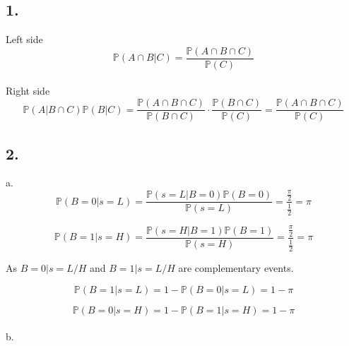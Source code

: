 \subsection*{1.}
Left side
$$\mathds{P}(A \cap B| C)=\frac{\mathds{P}(A\cap B \cap C)}{\mathds{P}(C)}$$
\\
Right side
$$\mathds{P}(A| B\cap C)\mathds{P}(B|C)=\frac{\mathds{P}(A \cap B \cap C)}{\mathds{P}(B \cap C)}\cdot \frac{\mathds{P}(B \cap C)}{\mathds{P}(C)}=\frac{\mathds{P}(A\cap B
 \cap C)}{\mathds{P}(C)}$$

\subsection*{2.}
a.
    $$\mathds{P}(B=0|s=L)=\frac{\mathds{P}(s=L|B=0)\mathds{P}(B=0)}{\mathds{P}(s=L)} = \frac{\frac{\pi}{2}}{\frac{1}{2}} = \pi$$

    $$\mathds{P}(B=1|s=H)=\frac{\mathds{P}(s=H|B=1)\mathds{P}(B=1)}{\mathds{P}(s=H)} = \frac{\frac{\pi}{2}}{\frac{1}{2}} = \pi$$
    
    As $B=0|s=L/H$ and $B=1|s=L/H$ are complementary events. 
    
    $$\mathds{P}(B=1|s=L)=1-\mathds{P}(B=0|s=L)=1-\pi$$
    
    $$\mathds{P}(B=0|s=H)=1-\mathds{P}(B=1|s=H)=1-\pi$$
\\    
b.
    
